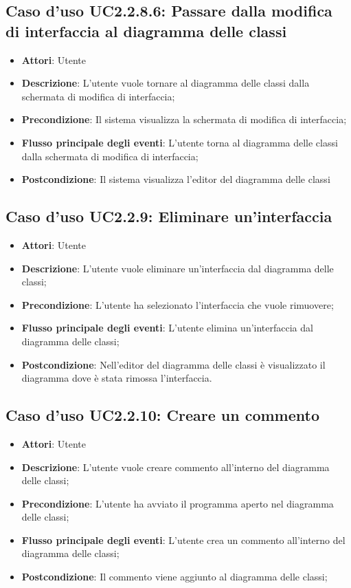\documentclass[../AnalisiDeiRequisiti.tex]{subfiles}
\begin{document}
			\subsection{Caso d'uso UC2.2.8.6: Passare dalla modifica di interfaccia al diagramma delle classi}
			\begin{itemize}
				\item \textbf{Attori}: Utente
				\item \textbf{Descrizione}: L'utente vuole tornare al diagramma delle classi dalla schermata di modifica di interfaccia;
				\item \textbf{Precondizione}: Il sistema visualizza la schermata di modifica di interfaccia;
				\item \textbf{Flusso principale degli eventi}: L'utente torna al diagramma delle classi dalla schermata di modifica di interfaccia;
				\item \textbf{Postcondizione}: Il sistema visualizza l'editor del diagramma delle classi
			\end{itemize}
			\subsection{Caso d'uso UC2.2.9: Eliminare un'interfaccia}
			\begin{itemize}
				\item \textbf{Attori}: Utente
				\item \textbf{Descrizione}: L'utente vuole eliminare un'interfaccia dal diagramma delle classi;
				\item \textbf{Precondizione}: L'utente ha selezionato l'interfaccia che vuole rimuovere;
				\item \textbf{Flusso principale degli eventi}: L'utente elimina un'interfaccia dal diagramma delle classi;
				\item \textbf{Postcondizione}: Nell'editor del diagramma delle classi è visualizzato il diagramma dove è stata rimossa l'interfaccia.
			\end{itemize}
			\subsection{Caso d'uso UC2.2.10: Creare un commento}
			\begin{itemize}
				\item \textbf{Attori}: Utente
				\item \textbf{Descrizione}: L'utente vuole creare commento all'interno del diagramma delle classi;
				\item \textbf{Precondizione}: L'utente ha avviato il programma aperto nel diagramma delle classi;
				\item \textbf{Flusso principale degli eventi}: L'utente crea un commento all'interno del diagramma delle classi;
				\item \textbf{Postcondizione}: Il commento viene aggiunto al diagramma delle classi;
			\end{itemize}
\end{document}
